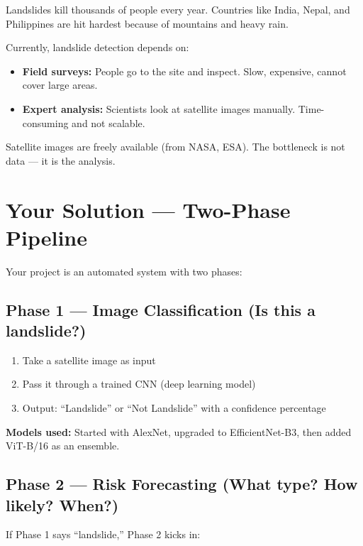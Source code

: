 \documentclass[11pt]{article}
\begin{document}
Landslides kill thousands of people every year. Countries like India, Nepal, and Philippines are hit hardest because of mountains and heavy rain.

Currently, landslide detection depends on:
\begin{itemize}[noitemsep]
    \item \textbf{Field surveys:} People go to the site and inspect. Slow, expensive, cannot cover large areas.
    \item \textbf{Expert analysis:} Scientists look at satellite images manually. Time-consuming and not scalable.
\end{itemize}

Satellite images are freely available (from NASA, ESA). The bottleneck is not data --- it is the analysis.

\section{Your Solution --- Two-Phase Pipeline}

Your project is an automated system with two phases:

\subsection{Phase 1 --- Image Classification (Is this a landslide?)}

\begin{enumerate}[noitemsep]
    \item Take a satellite image as input
    \item Pass it through a trained CNN (deep learning model)
    \item Output: ``Landslide'' or ``Not Landslide'' with a confidence percentage
\end{enumerate}

\textbf{Models used:} Started with AlexNet, upgraded to EfficientNet-B3, then added ViT-B/16 as an ensemble.

\subsection{Phase 2 --- Risk Forecasting (What type? How likely? When?)}

If Phase 1 says ``landslide,'' Phase 2 kicks in:
\end{document}
